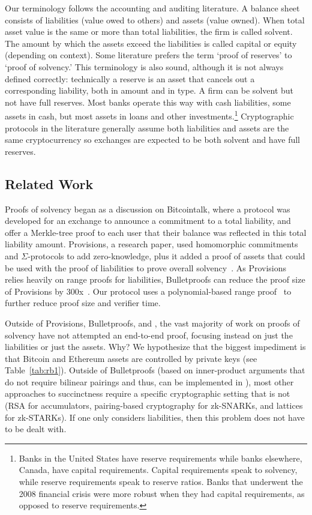 Our terminology follows the accounting and auditing literature. A balance sheet consists of liabilities (value owed to others) and assets (value owned). When total asset value is the same or more than total liabilities, the firm is called solvent. The amount by which the assets exceed the liabilities is called capital or equity (depending on context). Some literature prefers the term `proof of reserves' to `proof of solvency.' This terminology is also sound, although it is not always defined correctly: technically a reserve is an asset that cancels out a corresponding liability, both in amount and in type. A firm can be solvent but not have full reserves. Most banks operate this way with cash liabilities, some assets in cash, but most assets in loans and other investments.\footnote{Banks in the United States have reserve requirements while banks elsewhere, \eg Canada, have capital requirements. Capital requirements speak to solvency, while reserve requirements speak to reserve ratios. Banks that underwent the 2008 financial crisis were more robust when they had capital requirements, as opposed to reserve requirements.} Cryptographic protocols in the literature generally assume both liabilities and assets are the same cryptocurrency so exchanges are expected to be both solvent and have full reserves.

\subsection{Related Work}
\label{sec:rw}



Proofs of solvency began as a discussion on Bitcointalk, where a protocol was developed for an exchange to announce a commitment to a total liability, and offer a Merkle-tree proof to each user that their balance was reflected in this total liability amount. Provisions, a research paper, used homomorphic commitments and $\Sigma$-protocols to add zero-knowledge, plus it added a proof of assets that could be used with the proof of liabilities to prove overall solvency~\cite{provisions}. As Provisions relies heavily on range proofs for liabilities, Bulletproofs can reduce the proof size of Provisions by 300x~\cite{bulletproofs}. Our protocol uses a polynomial-based range proof~\cite{rangeproof} to further reduce proof size and verifier time.

Outside of Provisions, Bulletproofs, and \Sys, the vast majority of work on proofs of solvency have not attempted an end-to-end proof, focusing instead on just the liabilities or just the assets. Why? We hypothesize that the biggest impediment is that Bitcoin and Ethereum assets are controlled by \secp private keys (see Table~\ref{tab:rb1}). Outside of Bulletproofs (based on inner-product arguments that do not require bilinear pairings and thus, can be implemented in \secp), most other approaches to succinctness require a specific cryptographic setting that is not \secp (\ie RSA for accumulators, pairing-based cryptography for zk-SNARKs, and lattices for zk-STARKs). If one only considers liabilities, then this problem does not have to be dealt with.

